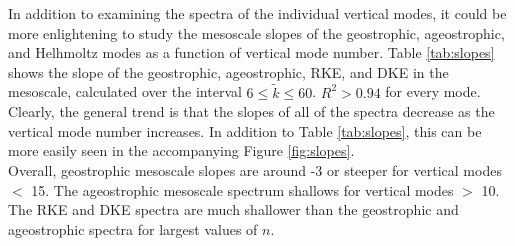 In addition to examining the spectra of the individual vertical modes, it could be more enlightening to study the mesoscale slopes of the geostrophic, ageostrophic, and Helhmoltz modes as a function of vertical mode number. Table \ref{tab:slopes} shows the slope of the geostrophic, ageostrophic, RKE, and DKE in the mesoscale, calculated over the interval $6 \leq \tilde{k} \leq 60$. $R^2 > 0.94$ for every mode. Clearly, the general trend is that the slopes of all of the spectra decrease as the vertical mode number increases.  In addition to Table \ref{tab:slopes}, this can be more easily seen in the accompanying Figure \ref{fig:slopes}.\\

Overall, geostrophic mesoscale slopes are around -3 or steeper for vertical modes $<$ 15. The ageostrophic mesoscale spectrum shallows for vertical modes $>$ 10. The RKE and DKE spectra are much shallower than the geostrophic and ageostrophic spectra for largest values of $n$.

